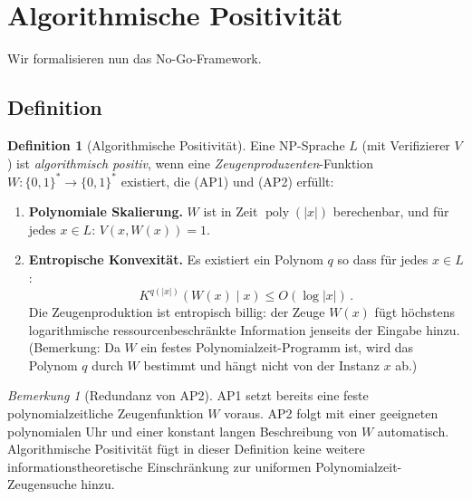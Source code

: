 \documentclass[aps,prd,twocolumn,superscriptaddress,nofootinbib]{revtex4-2}
\theoremstyle{definition}
\newtheorem{definition}[theorem]{Definition}
\theoremstyle{remark}
\newtheorem{remark}[theorem]{Bemerkung}
\DeclareMathOperator{\poly}{poly}
\begin{document}
\section{Algorithmische Positivität}
\label{sec:positivity}

Wir formalisieren nun das No-Go-Framework.

\subsection{Definition}

\begin{definition}[Algorithmische Positivität]
\label{def:alg_pos}
Eine NP-Sprache $L$ (mit Verifizierer $V$) ist \textit{algorithmisch positiv}, wenn eine \textit{Zeugenproduzenten}-Funktion $W: \{0,1\}^* \to \{0,1\}^*$ existiert, die (AP1) und (AP2) erfüllt:

\begin{enumerate}
\item[\textbf{(AP1)}] \textbf{Polynomiale Skalierung.} $W$ ist in Zeit $\poly(|x|)$ berechenbar, und für jedes $x \in L$: $V(x, W(x)) = 1$.

\item[\textbf{(AP2)}] \textbf{Entropische Konvexität.} Es existiert ein Polynom $q$ so dass für jedes $x \in L$:
\begin{equation}
K^{q(|x|)}(W(x) \mid x) \leq O(\log|x|)\,.
\end{equation}
Die Zeugenproduktion ist \glqq entropisch billig\grqq{}: der Zeuge $W(x)$ fügt höchstens logarithmische ressourcenbeschränkte Information jenseits der Eingabe hinzu. (Bemerkung: Da $W$ ein festes Polynomialzeit-Programm ist, wird das Polynom $q$ durch $W$ bestimmt und hängt nicht von der Instanz $x$ ab.)
\end{enumerate}
\end{definition}

\begin{remark}[Redundanz von AP2]
AP1 setzt bereits eine feste polynomialzeitliche Zeugenfunktion $W$ voraus. AP2 folgt mit einer geeigneten polynomialen Uhr und einer konstant langen Beschreibung von $W$ automatisch. Algorithmische Positivität fügt in dieser Definition keine weitere informationstheoretische Einschränkung zur uniformen Polynomialzeit-Zeugensuche hinzu.
\end{remark}
\end{document}
